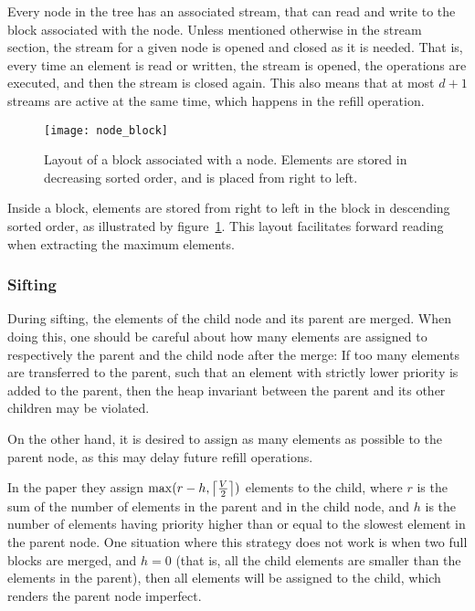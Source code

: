 Every node in the tree has an associated stream, that can read and
write to the block associated with the node. Unless mentioned otherwise
in the stream section, the stream for a given node is opened and
closed as it is needed. That is, every time an element is read
or written, the stream is opened, the operations are executed,
and then the stream is closed again. This also means that at
most $d + 1$ streams are active at the same time, which happens in
the refill operation.

\begin{figure}
  \centering
  \texttt{[image: node\_block]}
  \caption{Layout of a block associated with a node. Elements are
    stored in decreasing sorted order, and is placed from right to left.}
  \label{fig:node-block}
\end{figure}

Inside a block, elements are stored from right to left in the block in
descending sorted order, as illustrated by
figure~\ref{fig:node-block}. This layout facilitates forward reading
when extracting the maximum elements.

\subsubsection{Sifting}
\label{sec:heap:sifting}
During sifting, the elements of the child node and its parent are merged.
When doing this, one should be careful
about how many elements are assigned to respectively the parent and
the child node after the merge: If too many elements are transferred
to the parent, such that an element with strictly lower priority is
added to the parent, then the heap invariant between the parent and
its other children may be violated.

On the other hand, it is desired to assign as many elements as
possible to the parent node, as this may delay future refill
operations.

In the paper they assign $\max(r - h, \ceil*{\frac{V}{2}})$ elements to
the child, where $r$ is the sum of the number of elements in the
parent and in the child node, and $h$ is the number of elements
having priority higher than or equal to the slowest element in the parent node.
One situation where this strategy does not work is when two full blocks are merged, and $h =
0$ (that is, all the child elements are smaller than the elements in the parent),
then all elements will be assigned to the child, which renders the
parent node imperfect.

